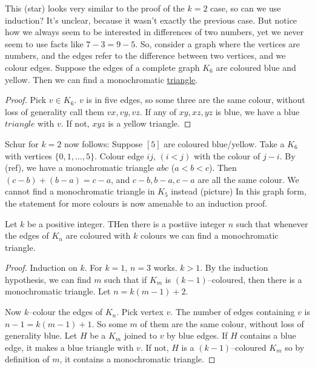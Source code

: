 \documentclass{article}
\begin{document}
This (star) looks very similar to the proof of the $k=2$ case, so can we use induction? It's unclear, because it wasn't exactly the previous case.  But notice how we always seem to be interested in differences of two numbers, yet we never seem to use facts like $7-3 = 9-5$.
So, consider a graph where the vertices are numbers, and the edges refer to the difference between two vertices, and we colour edges.
Suppose the edges of a complete graph $K_6$ are coloured blue and yellow. Then we can find a monochromatic \hyperref[def:triangle]{triangle}.
\begin{proof}
    Pick $v \in K_6$. $v$ is in five edges, so some three are the same colour, without loss of generality call them $vx, vy, vz$. If any of $xy, xz, yz$ is blue, we have a blue $triangle$ with $v$. If not, $xyz$ is a yellow triangle.
\end{proof}

\begin{remark}
    Schur for $k=2$ now follows: Suppose $[5]$ are coloured blue/yellow. Take a $K_6$ with vertices $\{0, 1, \dots, 5\}$. Colour edge $ij$, $(i<j)$ with the colour of $j-i$. By (ref), we have a monochromatic triangle $abc$ ($a<b<c$). Then $(c-b) + (b-a) = c-a$, and $c-b, b-a, c-a$ are all the same colour.
    We cannot find a monochromatic triangle in $K_5$ instead (picture)
    In this graph form, the statement for more colours is now amenable to an induction proof.
\end{remark}

\begin{nprop}
    Let $k$ be a positive integer. THen there is a postiive integer $n$ such that whenever the edges of $K_n$ are coloured with $k$ colours we can find a monochromatic triangle.
\end{nprop}

\begin{proof}
    Induction on $k$. For $k=1$, $n=3$ works.
    $k>1$. By the induction hypothesis, we can find $m$ such that if $K_m$ is $(k-1)$--coloured, then there is a monochromatic triangle.  Let $n = k(m-1) + 2$.

    Now $k$--colour the edges of $K_n$.  Pick vertex $v$.  The number of edges containing $v$ is $n-1 = k(m-1)+1$.  So some $m$ of them are the same colour, without loss of generality blue.  Let $H$ be a $K_m$ joined to $v$ by blue edges. If $H$ contains a blue edge, it makes a blue triangle with $v$. If not, $H$ is a $(k-1)$--coloured $K_m$ so by definition of $m$, it contains a monochromatic triangle.
\end{proof}
\end{document}
